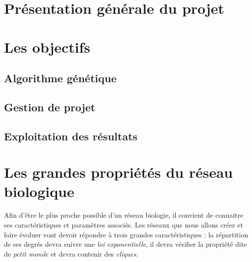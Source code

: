 


\maketitle

\section{Présentation générale du projet}


\section{Les objectifs}
\subsection*{Algorithme génétique}

\subsection*{Gestion de projet}

\subsection*{Exploitation des résultats}


\section{Les grandes propriétés du réseau biologique}
Afin d'être le plus proche possible d'un réseau biologie, il convient de connaitre ses caractéristiques et paramètres associés. Les réseaux que nous allons créer et faire évoluer vont devoir répondre à trois grandes caractéristiques : la répartition de ses degrés devra suivre une \textit{loi exponentielle}, il devra vérifier la propriété dite de \textit{\og petit monde \fg} et devra contenir des \textit{cliques}.

